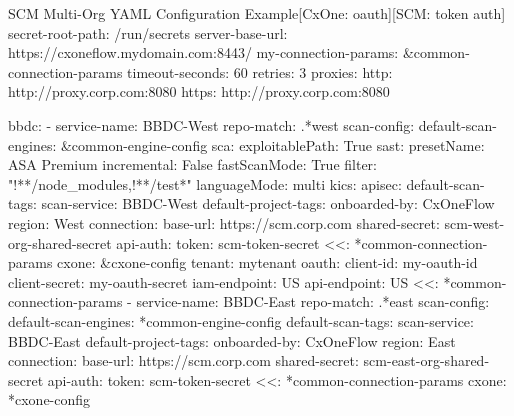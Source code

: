 \begin{code}{SCM Multi-Org YAML Configuration Example}{[CxOne: oauth]}{[SCM: token auth]}
secret-root-path: /run/secrets
server-base-url: https://cxoneflow.mydomain.com:8443/
my-connection-params: &common-connection-params
    timeout-seconds: 60
    retries: 3
    proxies:
    http: http://proxy.corp.com:8080
    https: http://proxy.corp.com:8080

bbdc:
    - service-name: BBDC-West
      repo-match: .*west
      scan-config: 
          default-scan-engines: &common-engine-config
              sca:
                  exploitablePath: True
              sast:
                  presetName: ASA Premium
                  incremental: False
                  fastScanMode: True
                  filter: "!**/node_modules,!**/test*"
                  languageMode: multi
              kics:
              apisec:
          default-scan-tags:
              scan-service: BBDC-West
          default-project-tags:
              onboarded-by: CxOneFlow
              region: West
      connection:
          base-url: https://scm.corp.com
          shared-secret: scm-west-org-shared-secret
          api-auth:
              token: scm-token-secret
          <<: *common-connection-params
      cxone: &cxone-config
          tenant: mytenant
          oauth:
              client-id: my-oauth-id
              client-secret: my-oauth-secret
          iam-endpoint: US
          api-endpoint: US
          <<: *common-connection-params
    - service-name: BBDC-East
      repo-match: .*east
      scan-config: 
          default-scan-engines: *common-engine-config
          default-scan-tags:
              scan-service: BBDC-East
          default-project-tags:
              onboarded-by: CxOneFlow
              region: East
      connection:
          base-url: https://scm.corp.com
          shared-secret: scm-east-org-shared-secret
          api-auth:
              token: scm-token-secret
          <<: *common-connection-params
      cxone: *cxone-config
\end{code}

